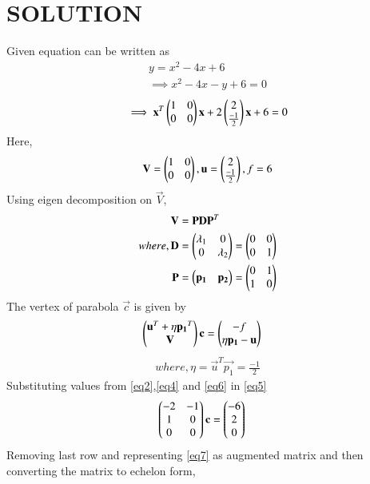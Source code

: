 \documentclass[journal,12pt,twocolumn]{IEEEtran}
\begin{document}
\section{SOLUTION} 
Given equation can be written as
\begin{align}
y = x^2-4x+6      \label{eq1}
\\
\implies x^2-4x-y+6 =0
\end{align}
\begin{align}
\implies \mathbf{x}^T \begin{pmatrix}1 & 0\\0 & 0\end{pmatrix}\mathbf{x}+ 2\begin{pmatrix}2 \\ \frac{-1}{2}\end{pmatrix}\mathbf{x}+6=0
\end{align}
Here,
\begin{align}
\mathbf{V} = \begin{pmatrix}1 & 0 \\ 0 & 0\end{pmatrix},\mathbf{u}=\begin{pmatrix}2 \\ \frac{-1}{2}\end{pmatrix},f=6  \label{eq2}
\end{align}
Using eigen decomposition on $\vec{V}$,
\begin{align}
\mathbf{V}&=\mathbf{P}\mathbf{D}\mathbf{P}^T
\\
where,\mathbf{D}&=\begin{pmatrix}\lambda_1 & 0 \\ 0 & \lambda_2\end{pmatrix} = \begin{pmatrix}0 & 0\\0 & 1\end{pmatrix}   \label{eq3}
\\
\mathbf{P}&=\begin{pmatrix}\mathbf{p_1} & \mathbf{p_2}\end{pmatrix} =\begin{pmatrix}0 & 1\\1 & 0\end{pmatrix}  \label{eq4}
\end{align}
The vertex of parabola $\vec{c}$ is given by
\begin{align}
\begin{pmatrix}\mathbf{u}^T + \eta\mathbf{p_1}^T \\ \mathbf{V}\end{pmatrix}\mathbf{c} &= \begin{pmatrix}-f \\ \eta\mathbf{p_1}-\mathbf{u}\end{pmatrix} \label{eq5}
\end{align}
\begin{align}
where,\eta=\vec{u}^T\vec{p_1}=\frac{-1}{2}  \label{eq6}
\end{align}
Substituting values from \eqref{eq2},\eqref{eq4} and \eqref{eq6} in \eqref{eq5}
\begin{align}
\begin{pmatrix}-2 & -1 \\ 1 & 0 \\ 0 & 0\end{pmatrix}\mathbf{c} &= \begin{pmatrix}-6 \\ 2 \\ 0\end{pmatrix} \label{eq7}
\end{align}
Removing last row and representing \eqref{eq7} as augmented matrix and then converting the matrix to echelon form,
\end{document}
